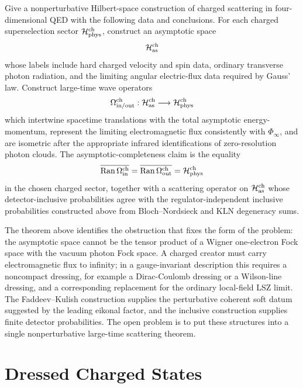 \begin{openproblem}
\label{op:qed-charged-asymptotic-completeness}
Give a nonperturbative Hilbert-space construction of charged scattering in
four-dimensional QED with the following data and conclusions.  For each
charged superselection sector \(\mathcal H_{\rm phys}^{\rm ch}\), construct an
asymptotic space
\[
  \mathcal H_{\rm as}^{\rm ch}
\]
whose labels include hard charged velocity and spin data, ordinary transverse
photon radiation, and the limiting angular electric-flux data required by
Gauss' law.  Construct large-time wave operators
\[
  \Omega_{\rm in/out}^{\rm ch}:
  \mathcal H_{\rm as}^{\rm ch}
  \longrightarrow
  \mathcal H_{\rm phys}^{\rm ch}
\]
which intertwine spacetime translations with the total asymptotic
energy-momentum, represent the limiting electromagnetic flux consistently with
\(\Phi_\infty\), and are isometric after the appropriate infrared
identifications of zero-resolution photon clouds.  The asymptotic-completeness
claim is the equality
\[
  \overline{\operatorname{Ran}\Omega_{\rm in}^{\rm ch}}
  =
  \overline{\operatorname{Ran}\Omega_{\rm out}^{\rm ch}}
  =
  \mathcal H_{\rm phys}^{\rm ch}
\]
in the chosen charged sector, together with a scattering operator on
\(\mathcal H_{\rm as}^{\rm ch}\) whose detector-inclusive probabilities agree
with the regulator-independent inclusive probabilities constructed above from
Bloch--Nordsieck and KLN degeneracy sums.

The theorem above identifies the obstruction that fixes the form of the
problem: the asymptotic space cannot be the tensor product of a Wigner
one-electron Fock space with the vacuum photon Fock space.  A charged creator
must carry electromagnetic flux to infinity; in a gauge-invariant description
this requires a noncompact dressing, for example a Dirac-Coulomb dressing or a
Wilson-line dressing, and a corresponding replacement for the ordinary
local-field LSZ limit.  The Faddeev--Kulish construction supplies the
perturbative coherent soft datum suggested by the leading eikonal factor, and
the inclusive construction supplies finite detector probabilities.  The open
problem is to put these structures into a single nonperturbative large-time
scattering theorem.
\end{openproblem}

\section{Dressed Charged States}


